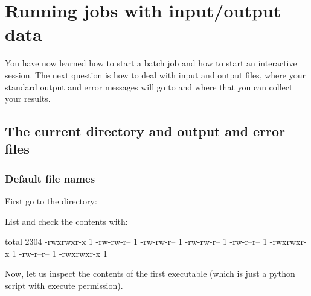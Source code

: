 \chapter{Running jobs with input/output data}

You have now learned how to start a batch job and how to start an interactive
session.  The next question is how to deal with input and output files, where
your standard output and error messages will go to and where that you can
collect your results.

\section{The current directory and output and error files}

\subsection{Default file names}

First go to the directory:

\begin{prompt}
\end{prompt}

List and check the contents with:
\begin{prompt}
total 2304
-rwxrwxr-x 1 %
-rw-rw-r-- 1 %
-rw-rw-r-- 1 %
-rw-rw-r-- 1 %
-rw-r--r-- 1 %
-rwxrwxr-x 1 %
-rw-r--r-- 1 %
-rwxrwxr-x 1 %
\end{prompt}

Now, let us inspect the contents of the first executable (which is just a
python script with execute permission).


